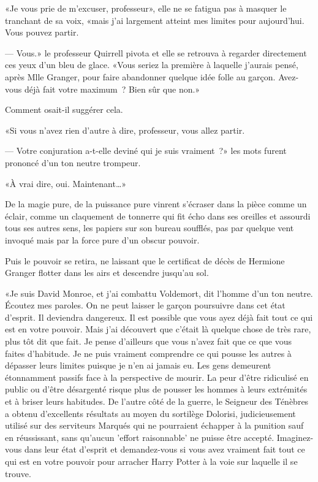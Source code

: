 «Je vous prie de m'excuser, professeur», elle ne se fatigua pas à masquer le tranchant de sa voix, «mais j'ai largement atteint mes limites pour aujourd'hui. Vous pouvez partir.

--- Vous.» le professeur Quirrell pivota et elle se retrouva à regarder directement ces yeux d'un bleu de glace. «Vous seriez la première à laquelle j'aurais pensé, après Mlle Granger, pour faire abandonner quelque idée folle au garçon. Avez-vous déjà fait votre maximum~? Bien sûr que non.»

Comment osait-il suggérer cela.

«Si vous n'avez rien d'autre à dire, professeur, vous allez partir.

--- Votre conjuration a-t-elle deviné qui je suis vraiment~?» les mots furent prononcé d'un ton neutre trompeur.

«À vrai dire, oui. Maintenant…»

De la magie pure, de la puissance pure vinrent s'écraser dans la pièce comme un éclair, comme un claquement de tonnerre qui fit écho dans ses oreilles et assourdi tous ses autres sens, les papiers sur son bureau soufflés, pas par quelque vent invoqué mais par la force pure d'un obscur pouvoir.

Puis le pouvoir se retira, ne laissant que le certificat de décès de Hermione Granger flotter dans les airs et descendre jusqu'au sol.

«Je suis David Monroe, et j'ai combattu Voldemort, dit l'homme d'un ton neutre. Écoutez mes paroles. On ne peut laisser le garçon poursuivre dans cet état d'esprit. Il deviendra dangereux. Il est possible que vous ayez déjà fait tout ce qui est en votre pouvoir. Mais j'ai découvert que c'était là quelque chose de très rare, plus tôt dit que fait. Je pense d'ailleurs que vous n'avez fait que ce que vous faites d'habitude. Je ne puis vraiment comprendre ce qui pousse les autres à dépasser leurs limites puisque je n'en ai jamais eu. Les gens demeurent étonnamment passifs face à la perspective de mourir. La peur d'être ridiculisé en public ou d'être désargenté risque plus de pousser les hommes à leurs extrémités et à briser leurs habitudes. De l'autre côté de la guerre, le Seigneur des Ténèbres a obtenu d'excellents résultats au moyen du sortilège Dolorisi, judicieusement utilisé sur des serviteurs Marqués qui ne pourraient échapper à la punition sauf en réussissant, sans qu'aucun 'effort raisonnable' ne puisse être accepté. Imaginez-vous dans leur état d'esprit et demandez-vous si vous avez vraiment fait tout ce qui est en votre pouvoir pour arracher Harry Potter à la voie sur laquelle il se trouve.

